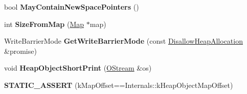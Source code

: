 \begin{DoxyCompactItemize}
\item 
\hypertarget{classv8_1_1internal_1_1_heap_object_ae0f1dde9fd7f1d625f842d07c656643c}{}bool {\bfseries May\+Contain\+New\+Space\+Pointers} ()\label{classv8_1_1internal_1_1_heap_object_ae0f1dde9fd7f1d625f842d07c656643c}

\item 
\hypertarget{classv8_1_1internal_1_1_heap_object_af343e340194a7e19c9c7ff91bed7bf95}{}int {\bfseries Size\+From\+Map} (\hyperlink{classv8_1_1internal_1_1_map}{Map} $\ast$map)\label{classv8_1_1internal_1_1_heap_object_af343e340194a7e19c9c7ff91bed7bf95}

\item 
\hypertarget{classv8_1_1internal_1_1_heap_object_acfba4c3365f4b6c70caa7c0ec14e4244}{}Write\+Barrier\+Mode {\bfseries Get\+Write\+Barrier\+Mode} (const \hyperlink{classv8_1_1internal_1_1_per_thread_assert_scope_debug_only}{Disallow\+Heap\+Allocation} \&promise)\label{classv8_1_1internal_1_1_heap_object_acfba4c3365f4b6c70caa7c0ec14e4244}

\item 
\hypertarget{classv8_1_1internal_1_1_heap_object_af1696653bbe9fefc6bd9fc86cafe8440}{}void {\bfseries Heap\+Object\+Short\+Print} (\hyperlink{classv8_1_1internal_1_1_o_stream}{O\+Stream} \&os)\label{classv8_1_1internal_1_1_heap_object_af1696653bbe9fefc6bd9fc86cafe8440}

\item 
\hypertarget{classv8_1_1internal_1_1_heap_object_a1131daa4da3892fce29f1292aabafab3}{}{\bfseries S\+T\+A\+T\+I\+C\+\_\+\+A\+S\+S\+E\+R\+T} (k\+Map\+Offset==Internals\+::k\+Heap\+Object\+Map\+Offset)\label{classv8_1_1internal_1_1_heap_object_a1131daa4da3892fce29f1292aabafab3}

\end{DoxyCompactItemize}
